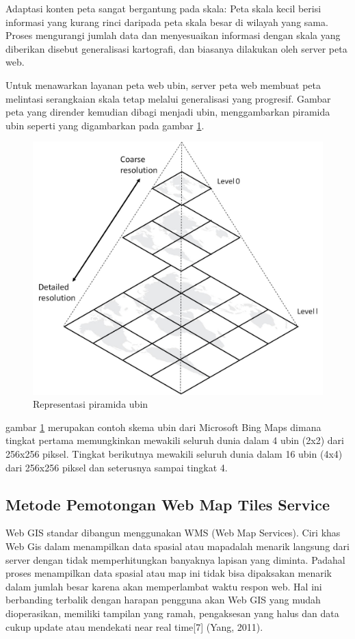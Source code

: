 Adaptasi konten peta sangat bergantung pada skala: Peta skala kecil berisi informasi yang kurang rinci daripada peta skala besar 
di wilayah yang sama. Proses mengurangi jumlah data dan menyesuaikan informasi dengan skala yang diberikan disebut generalisasi 
kartografi, dan biasanya dilakukan oleh server peta web.

Untuk menawarkan layanan peta web ubin, server peta web membuat peta melintasi serangkaian skala tetap melalui generalisasi yang 
progresif. Gambar peta yang dirender kemudian dibagi menjadi ubin, menggambarkan piramida ubin seperti yang digambarkan pada
gambar \ref{TilePyramid}.

\begin{figure}[ht]

\centerline{\includegraphics[width=1\textwidth]{figures/TilePyramid.jpg}}

\caption{Representasi piramida ubin}

\label{TilePyramid}

\end{figure}

gambar \ref{TilePyramid} merupakan contoh skema ubin dari Microsoft Bing Maps dimana tingkat pertama memungkinkan mewakili 
seluruh dunia dalam 4 ubin (2x2) dari  256x256 piksel. Tingkat berikutnya mewakili seluruh dunia dalam 16 ubin (4x4) dari 256x256 
piksel dan seterusnya sampai tingkat 4. 

\subsection{Metode Pemotongan Web Map Tiles Service}
Web GIS standar dibangun menggunakan WMS (Web Map Services). Ciri khas Web Gis dalam menampilkan data spasial atau mapadalah menarik 
langsung dari server dengan tidak memperhitungkan banyaknya lapisan yang diminta. Padahal proses menampilkan data spasial atau map ini 
tidak bisa dipaksakan menarik dalam jumlah besar karena akan memperlambat waktu respon web. Hal ini berbanding terbalik dengan harapan 
pengguna akan Web GIS yang mudah dioperasikan, memiliki tampilan yang ramah, pengaksesan yang halus dan data cukup update atau mendekati 
near real time[7] (Yang, 2011). 

